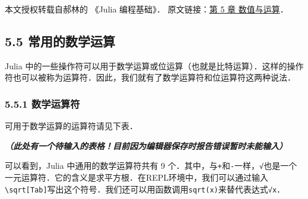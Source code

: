 
本文授权转载自郝林的 《Julia 编程基础》． 原文链接：\href{https://github.com/hyper0x/JuliaBasics/blob/master/book/ch05.md}{第 5 章 数值与运算}．


\subsection{5.5 常用的数学运算}

Julia 中的一些操作符可以用于数学运算或位运算（也就是比特运算）．这样的操作符也可以被称为运算符．因此，我们就有了数学运算符和位运算符这两种说法．

\subsubsection{5.5.1 数学运算符}

可用于数学运算的运算符请见下表．

\textsl{\textbf{（此处有一个待输入的表格！目前因为编辑器保存时报告错误暂时未能输入）}}

可以看到，Julia 中通用的数学运算符共有 9 个．其中，与\verb|+|和\verb|-|一样，\verb|√|也是一个一元运算符．它的含义是求平方根．在REPL环境中，我们可以通过输入\verb|\sqrt[Tab]|写出这个符号．我们还可以用函数调用\verb|sqrt(x)|来替代表达式\verb|√x|．

